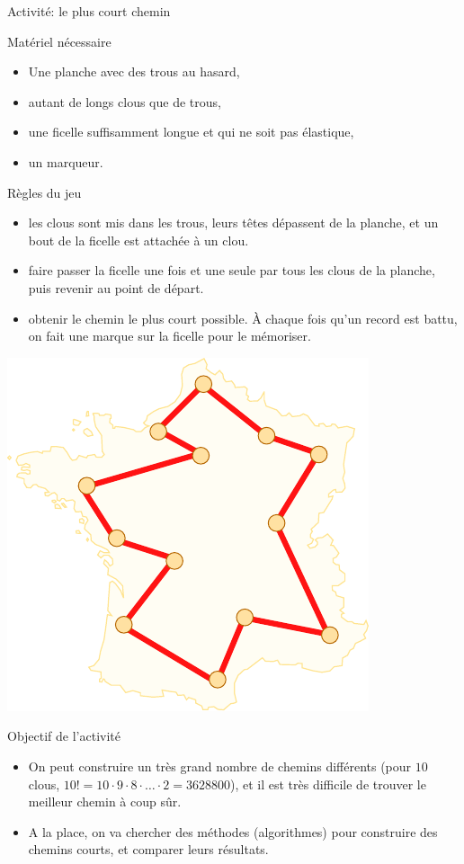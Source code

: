 \begin{frame}{Activité: le plus court chemin}
  
  \begin{block}{Matériel nécessaire}
    \begin{itemize}
    \item Une planche avec des trous au hasard,
    \item autant de longs clous que de trous,
    \item une ficelle suffisamment longue et \alert{qui ne soit pas élastique},
    \item un marqueur.
    \end{itemize}
  \end{block}

  \begin{block}{Règles du jeu}
    \begin{itemize}
    \item {} les clous sont mis dans les trous, leurs têtes dépassent de la planche, et un bout de la ficelle est attachée à un clou.
    \item {} faire passer la ficelle \alert{une fois et une seule} par \alert{tous les clous} de la planche, puis revenir au point de départ.
    \item  {} obtenir le chemin le plus court possible. À chaque fois qu'un record est battu, on fait une marque sur la ficelle pour le mémoriser.
    \end{itemize}
  \end{block}

  \begin{center}
    \includegraphics[width=0.3\linewidth]{img/tsp.pdf}
  \end{center}

  \begin{block}{Objectif de l'activité}
    \begin{itemize}
    \item On peut construire un très grand nombre de chemins différents (pour $10$ clous, $10! = 10 \cdot 9 \cdot 8 \cdot \ldots \cdot 2 = 3628800$), et il est très difficile de trouver le meilleur chemin à coup sûr.
    \item A la place, on va chercher des méthodes (algorithmes) pour construire des chemins courts, et comparer leurs résultats.
    \end{itemize}
  \end{block}

\end{frame}

